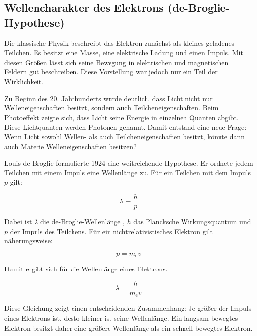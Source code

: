 \subsection{Wellencharakter des Elektrons (de-Broglie-Hypothese)}
\label{subsec:wellencharakter_elektron}

Die klassische Physik beschreibt das Elektron zunächst als
kleines geladenes Teilchen. Es besitzt eine Masse, eine
elektrische Ladung und einen Impuls. Mit diesen Größen lässt sich
seine Bewegung in elektrischen und magnetischen Feldern gut beschreiben. Diese
Vorstellung war jedoch nur ein Teil der Wirklichkeit.

Zu Beginn des 20. Jahrhunderts wurde deutlich, dass Licht nicht nur
Welleneigenschaften besitzt, sondern auch
Teilcheneigenschaften. Beim Photoeffekt
 zeigte sich, dass Licht seine Energie in einzelnen Quanten
abgibt. Diese Lichtquanten werden Photonen genannt. Damit entstand
eine neue Frage: Wenn Licht sowohl Wellen- als auch Teilcheneigenschaften
besitzt, könnte dann auch Materie Welleneigenschaften besitzen?

Louis de Broglie formulierte 1924 eine weitreichende
Hypothese. Er ordnete jedem Teilchen mit einem Impuls eine Wellenlänge zu. Für
ein Teilchen mit dem Impuls \(p\) gilt:

\begin{equation}
	\lambda = \frac{h}{p}
	\label{eq:de_broglie_wellenlaenge}
\end{equation}

Dabei ist \(\lambda\) die de-Broglie-Wellenlänge
, \(h\) das
Plancksche Wirkungsquantum und \(p\) der Impuls des Teilchens. Für ein
nichtrelativistisches Elektron gilt näherungsweise:

\begin{equation}
	p = m_\mathrm{e} v
	\label{eq:impuls_elektron_klassisch}
\end{equation}

Damit ergibt sich für die Wellenlänge eines Elektrons:

\begin{equation}
	\lambda = \frac{h}{m_\mathrm{e} v}
	\label{eq:de_broglie_elektron}
\end{equation}

Diese Gleichung zeigt einen entscheidenden Zusammenhang: Je größer der Impuls
eines Elektrons ist, desto kleiner ist seine Wellenlänge. Ein langsam bewegtes
Elektron besitzt daher eine größere Wellenlänge als ein schnell bewegtes
Elektron.

